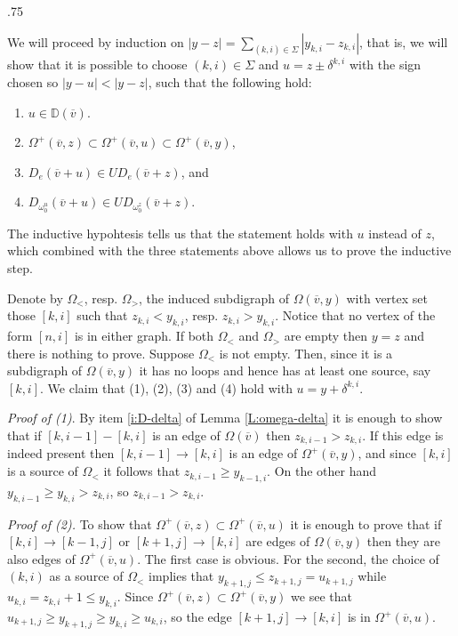 \documentclass[11pt,fleqn]{amsart}
\makeatletter
\renewcommand\proofname{Proof}
\renewenvironment{proof}[1][\textit{\proofname}]{\par
 \pushQED{\qed}%
 \normalfont \topsep.75\paraskip\relax
 \trivlist
 \item[\hskip\labelsep
 \itshape
 #1\@addpunct{.}]\ignorespaces
}{%
 \popQED\endtrivlist\@endpefalse
}
\newcounter{para}[section]
\renewcommand\to{\rightarrow}
\newcommand\vv{\overline{v}}
\newcommand\DD{\mathbb D}
\makeatother
\begin{document}
\begin{proof}
We will proceed by induction on $|y-z| = \sum_{(k,i) \in \Sigma} |y_{k,i} - 
z_{k,i}|$, that is, we will show that it is possible to choose $(k,i) \in 
\Sigma$ and $u = z \pm \delta^{k,i}$ with the sign chosen so $|y-u|<|y-z|$, 
such that the following hold:
\begin{enumerate}
\item $u \in \DD(\vv)$.

\item $\Omega^+(\vv,z) \subset \Omega^+(\vv,u) \subset \Omega^+(\vv,y)$,

\item $D_{e}(\vv + u) \in U D_{e}(\vv + z)$, and

\item $D_{\omega_0^u}(\vv + u) \in U D_{\omega_0^z}(\vv + z)$.
\end{enumerate}
The inductive hypohtesis tells us that the statement holds with $u$ instead
of $z$, which combined with the three statements above allows us to prove
the inductive step.

Denote by $\Omega_<$, resp. $\Omega_>$, the induced subdigraph of 
$\Omega(\vv,y)$ with vertex set those $[k,i]$ such that $z_{k,i} < y_{k,i}$, 
resp. $z_{k,i} > y_{k,i}$. Notice that no vertex of the form $[n,i]$ is in 
either graph. If both $\Omega_<$ and $\Omega_>$ are empty then 
$y = z$ and there is nothing to prove. Suppose $\Omega_<$ is not empty. Then, 
since it is a subdigraph of $\Omega(\vv,y)$ it has no loops and hence has at 
least one source, say $[k,i]$. We claim that (1), (2), (3) and (4) hold with 
$u = y + \delta^{k,i}$.

\emph{Proof of (1)}. By item \ref{i:D-delta} of Lemma \ref{L:omega-delta}
it is enough to show that if $[k,i-1] - [k,i]$ is an edge of $\Omega(\vv)$ 
then $z_{k,i-1} > z_{k,i}$. If this edge is indeed present then $[k,i-1] \to 
[k,i]$ is an edge of $\Omega^+(\vv,y)$, and since $[k,i]$ is a source of 
$\Omega_<$ it follows that $z_{k,i-1} \geq y_{k-1,i}$. On the other hand
$y_{k,i-1} \geq y_{k,i} > z_{k,i}$, so $z_{k,i-1} > z_{k,i}$.

\emph{Proof of (2).} To show that $\Omega^+(\vv,z) \subset \Omega^+(\vv,u)$ 
it is enough to prove that if $[k,i] \to [k-1,j]$ or $[k+1,j] \to [k,i]$ are 
edges of $\Omega(\vv,y)$ then they are also edges of $\Omega^+(\vv,u)$. The 
first case is obvious. For the second, the choice of $(k,i)$ as a source of 
$\Omega_<$ implies that $y_{k+1,j} \leq z_{k+1,j} = u_{k+1,j}$ while $u_{k,i}
= z_{k,i} + 1 \leq y_{k,i}$. Since $\Omega^+(\vv,z) \subset \Omega^+(\vv,y)$
we see that $u_{k+1,j} \geq y_{k+1,j} \geq y_{k,i} \geq u_{k,i}$, so the edge
$[k+1,j] \to [k,i]$ is in $\Omega^+(\vv,u)$.


\end{proof}
\end{document}
